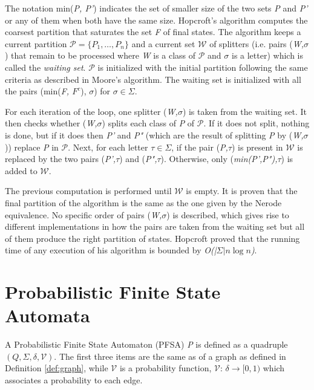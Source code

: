 {The notation min(\textit{P, P'}) indicates the set of smaller size of the two sets \textit{P} and \textit{P'} or any of them when both have the same size. Hopcroft's algorithm computes the coarsest partition that saturates the set \textit{F} of final states. The algorithm keeps a current partition $\mathcal{P} = \{P_1, \ldots, P_n\}$ and a current set $\mathcal{W}$ of splitters (i.e. pairs (\textit{W,$\sigma$}) that remain to be processed where \textit{W} is a class of $\mathcal{P}$ and $\sigma$ is a letter) which is called the \textit{waiting set}. $\mathcal{P}$ is initialized with the initial partition following the same criteria as described in Moore's algorithm. The waiting set is initialized with all the pairs (min(\textit{F, $F^c$}), $\sigma$) for $\sigma\in\Sigma$.

For each iteration of the loop, one splitter (\textit{W,$\sigma$}) is taken from the waiting set. It then checks whether (\textit{W,$\sigma$}) splits each class of \textit{P} of $\mathcal{P}$. If it does not split, nothing is done, but if it does then \textit{P'} and \textit{P"} (which are the result of splitting \textit{P} by (\textit{W,$\sigma$})) replace \textit{P} in $\mathcal{P}$. Next, for each letter $\tau\in\Sigma$, if the pair (\textit{P,$\tau$}) is present in $\mathcal{W}$ is replaced by the two pairs (\textit{P',$\tau$}) and (\textit{P",$\tau$}). Otherwise, only (\textit{min(P',P"),$\tau$}) is added to $\mathcal{W}$.

The previous computation is performed until $\mathcal{W}$ is empty. It is proven that the final partition of the algorithm is the same as the one given by the Nerode equivalence. No specific order of pairs (\textit{W,$\sigma$}) is described, which gives rise to different implementations in how the pairs are taken from the waiting set but all of them produce the right partition of states. Hopcroft proved that the running time of any execution of his algorithm is bounded by \textit{O(|$\Sigma| n\log n$)}.

\section{Probabilistic Finite State Automata}

\begin{definition}\label{definition:pfsa}
A Probabilistic Finite State Automaton (PFSA) \textit{P} is defined as a quadruple $(Q, \Sigma, \delta, \mathcal{V})$. The first three items are the same as of a graph as defined in Definition \ref{def:graph}, while  $\mathcal{V}$ is a probability function, $\mathcal{V}$: $\delta \rightarrow [0,1)$ which associates a probability to each edge.
\end{definition}

}

